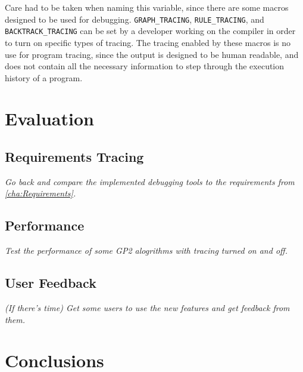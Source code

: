 \documentclass[authoryearcitations]{UoYCSproject}
\begin{document}
Care had to be taken when naming this variable, since there are some macros
designed to be used for debugging. \texttt{GRAPH\_TRACING}, \texttt{RULE\_TRACING},
and \texttt{BACKTRACK\_TRACING} can be set by a developer working on the compiler
in order to turn on specific types of tracing. The tracing enabled by these macros
is no use for program tracing, since the output is designed to be human readable,
and does not contain all the necessary information to step through the execution
history of a program.

\clearpage


\chapter{Evaluation}
\label{cha:Evaluation}

\section{Requirements Tracing}
\label{sec:RequirementsTracing}

\emph{Go back and compare the implemented debugging tools to the requirements
from \autoref{cha:Requirements}.}


\section{Performance}
\label{sec:Performance}

\emph{Test the performance of some GP2 alogrithms with tracing turned on and off.}


\section{User Feedback}
\label{sec:UserFeedback}

\emph{(If there's time) Get some users to use the new features and get feedback
from them.}

\clearpage


\chapter{Conclusions}
\label{cha:Conclusions}
\end{document}
